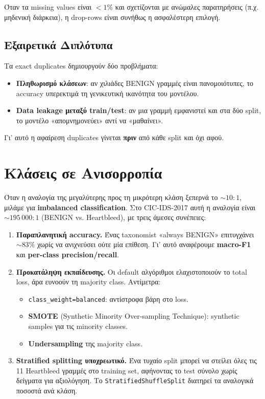 \documentclass[12pt,a4paper,twoside]{book}
\begin{document}
Όταν τα missing values είναι \(<1\%\) και σχετίζονται με ανώμαλες
παρατηρήσεις (π.χ. μηδενική διάρκεια), η drop-rows είναι συνήθως η
ασφαλέστερη επιλογή.

\subsection{Εξαιρετικά Διπλότυπα}

Τα exact duplicates δημιουργούν δύο προβλήματα:
\begin{itemize}
    \item \textbf{Πληθωρισμό κλάσεων}: αν χιλιάδες BENIGN γραμμές είναι
    πανομοιότυπες, το accuracy υπερεκτιμά τη γενικευτική ικανότητα του
    μοντέλου.
    \item \textbf{Data leakage μεταξύ train/test}: αν μια γραμμή εμφανιστεί
    και στα δύο split, το μοντέλο «απομνημονεύει» αντί να «μαθαίνει».
\end{itemize}

Γι' αυτό η αφαίρεση duplicates γίνεται \textbf{πριν} από κάθε split και
όχι αφού.

\section{Κλάσεις σε Ανισορροπία}

Όταν η αναλογία της μεγαλύτερης προς τη μικρότερη κλάση ξεπερνά το
\(\sim 10:1\), μιλάμε για \textbf{imbalanced classification}. Στο
CIC-IDS-2017 αυτή η αναλογία είναι \(\sim 195\,000:1\) (BENIGN vs.
Heartbleed), με τρεις άμεσες συνέπειες:

\begin{enumerate}
    \item \textbf{Παραπλανητική accuracy.} Ένας taxonomist «always
    BENIGN» επιτυγχάνει \(\sim 83\%\) χωρίς να ανιχνεύσει ούτε μία επίθεση.
    Γι' αυτό αναφέρουμε \textbf{macro-F1} και \textbf{per-class precision/recall}.

    \item \textbf{Προκατάληψη εκπαίδευσης.} Οι default αλγόριθμοι
    ελαχιστοποιούν το total loss, άρα ευνοούν τη majority class. Αντίμετρα:
    \begin{itemize}
        \item \texttt{class\_weight=\textquotesingle balanced\textquotesingle}: αντίστροφα βάρη
        στο loss.
        \item \textbf{SMOTE} (Synthetic Minority Over-sampling Technique):
        synthetic samples για τις minority classes.
        \item \textbf{Undersampling} της majority class.
    \end{itemize}

    \item \textbf{Stratified splitting υποχρεωτικό.} Ένα τυχαίο split
    μπορεί να στείλει όλες τις 11 Heartbleed γραμμές στο training set,
    αφήνοντας το test σύνολο χωρίς δείγματα για αξιολόγηση. Το
    \texttt{StratifiedShuffleSplit} διατηρεί τα αναλογικά ποσοστά ανά κλάση.
\end{enumerate}
\end{document}
